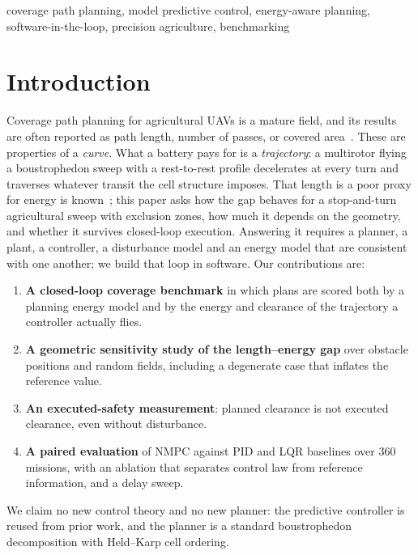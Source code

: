 \documentclass[\PAPERCLASSOPT]{IEEEtran}
\begin{document}
\begin{IEEEkeywords}
coverage path planning, model predictive control, energy-aware planning,
software-in-the-loop, precision agriculture, benchmarking
\end{IEEEkeywords}

\section{Introduction}

Coverage path planning for agricultural UAVs is a mature field, and its results
are often reported as path length, number of passes, or covered
area~\cite{galceran2013survey,hoffmann2024guidance}. These are properties of a
\emph{curve}. What a battery pays for is a \emph{trajectory}: a multirotor flying
a boustrophedon sweep with a rest-to-rest profile decelerates at every turn and
traverses whatever transit the cell structure imposes. That length is a poor
proxy for energy is known~\cite{datsko2024energy,bahnemann2019gtsp}; this paper
asks how the gap behaves for a stop-and-turn agricultural sweep with exclusion
zones, how much it depends on the geometry, and whether it survives
closed-loop execution. Answering it requires a planner, a plant, a controller, a disturbance model and
an energy model that are consistent with one another; we build that loop in
software. Our contributions are:

\begin{enumerate}
  \item \textbf{A closed-loop coverage benchmark} in which plans are scored both
        by a planning energy model and by the energy and clearance of the
        trajectory a controller actually flies.
  \item \textbf{A geometric sensitivity study of the length--energy gap} over
        obstacle positions and random fields, including a degenerate case that
        inflates the reference value.
  \item \textbf{An executed-safety measurement}: planned clearance is not
        executed clearance, even without disturbance.
  \item \textbf{A paired evaluation} of NMPC against PID and LQR baselines
        over 360 missions, with an ablation that separates control law from
        reference information, and a delay sweep.
\end{enumerate}
We claim no new control theory and no new planner: the predictive controller is
reused from prior work, and the planner is a standard boustrophedon
decomposition with Held--Karp cell ordering.
\end{document}
